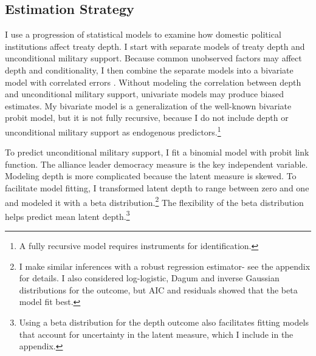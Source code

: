 \documentclass[12pt]{article}
\begin{document}
\subsection{Estimation Strategy}



I use a progression of statistical models to examine how domestic political institutions affect treaty depth. 
I start with separate models of treaty depth and unconditional military support. 
Because common unobserved factors may affect depth and conditionality, I then combine the separate models into a bivariate model with correlated errors \citep{Braumoelleretal2018}.
Without modeling the correlation between depth and unconditional military support, univariate models may produce biased estimates. 
My bivariate model is a generalization of the well-known bivariate probit model, but it is not fully recursive, because I do not include depth or unconditional military support as endogenous predictors.\footnote{A fully recursive model requires instruments for identification.}  


To predict unconditional military support, I fit a binomial model with probit link function. 
The alliance leader democracy measure is the key independent variable.
Modeling depth is more complicated because the latent measure is skewed.
To facilitate model fitting, I transformed latent depth to range between zero and one and modeled it with a beta distribution.\footnote{I make similar inferences with a robust regression estimator- see the appendix for details. I also considered log-logistic, Dagum and inverse Gaussian distributions for the outcome, but AIC and residuals showed that the beta model fit best.}
The flexibility of the beta distribution helps predict mean latent depth.\footnote{Using a beta distribution for the depth outcome also facilitates fitting models that account for uncertainty in the latent measure, which I include in the appendix.} 
\end{document}
